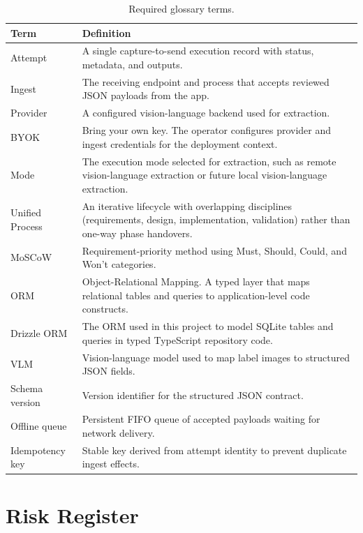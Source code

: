 \begin{table}[htbp]
\centering
\begin{tabularx}{\textwidth}{>{\raggedright\arraybackslash}p{}X}
\toprule
Term & Definition \\
\midrule
Attempt & A single capture-to-send execution record with status, metadata, and outputs. \\
Ingest & The receiving endpoint and process that accepts reviewed JSON payloads from the app. \\
Provider & A configured vision-language backend used for extraction. \\
BYOK & Bring your own key. The operator configures provider and ingest credentials for the deployment context. \\
Mode & The execution mode selected for extraction, such as remote vision-language extraction or future local vision-language extraction. \\
Unified Process & An iterative lifecycle with overlapping disciplines (requirements, design, implementation, validation) rather than one-way phase handovers. \\
MoSCoW & Requirement-priority method using Must, Should, Could, and Won't categories. \\
ORM & Object-Relational Mapping. A typed layer that maps relational tables and queries to application-level code constructs. \\
Drizzle ORM & The ORM used in this project to model SQLite tables and queries in typed TypeScript repository code. \\
VLM & Vision-language model used to map label images to structured JSON fields. \\
Schema version & Version identifier for the structured JSON contract. \\
Offline queue & Persistent FIFO queue of accepted payloads waiting for network delivery. \\
Idempotency key & Stable key derived from attempt identity to prevent duplicate ingest effects. \\
\bottomrule
\end{tabularx}
\caption{Required glossary terms.}
\label{tab:glossary}
\end{table}

\section{Risk Register}

